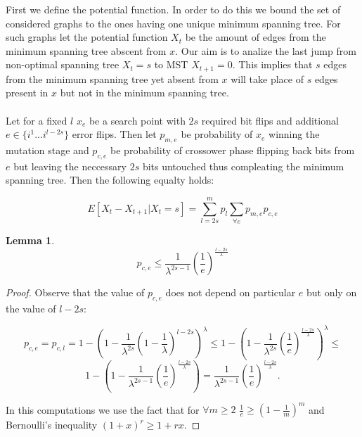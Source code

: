 \documentclass{article}
\newtheorem{lemma}[theorem]{Lemma}
\begin{document}
First we define the potential function. In order to do this we bound the set of considered graphs to the ones having one unique minimum spanning tree. For such graphs let the potential function $X_t$ be the amount of edges from the minimum spanning tree abscent from $x$. Our aim is to analize the last jump from non-optimal spanning tree $X_t = s$ to MST $X_{t + 1} = 0$. This implies that $s$ edges from the minimum spanning tree yet absent from $x$ will take place of $s$ edges present in $x$ but not in the minimum spanning tree.
\\
\\
Let for a fixed $l$ $x_e$ be a search point with $2s$ required bit flips and additional $e \in \{i^1...i^{l-2s}\}$ error flips. Then let $p_{m,e}$ be probability of $x_e$ winning the mutation stage and $p_{c,e}$ be probability of crossower phase flipping back bits from $e$ but leaving the neccessary $2s$ bits untouched thus compleating the minimum spanning tree. Then the following equalty holds:

$$
E[X_t - X_{t+1} | X_t = s] = \sum_{l=2s}^{m} p_l \sum_{\forall e} p_{m,e} p_{c,e}
$$


\begin{lemma}
$$ p_{c, e} \leq \frac{1}{\lambda^{2s - 1}}(\frac{1}{e})^\frac{l - 2s}{\lambda} $$
\end{lemma}
\begin{proof}
Observe that the value of $p_{c, e}$ does not depend on particular $e$ but only on the value of $l - 2s$:

$$
p_{c, e} = p_{c, l} = 
1 - (1 - \frac{1}{\lambda^{2s}}(1 - \frac{1}{\lambda})^{l - 2s})^\lambda \leq
1 - (1 - \frac{1}{\lambda^{2s}}(\frac{1}{e})^\frac{l - 2s}{\lambda})^\lambda \leq
$$
$$
1 - (1 - \frac{1}{\lambda^{2s - 1}}(\frac{1}{e})^\frac{l - 2s}{\lambda}) =
 \frac{1}{\lambda^{2s - 1}}(\frac{1}{e})^\frac{l - 2s}{\lambda}.
$$

In this computations we use the fact that for  $\forall m \geq 2$  $\frac{1}{e} \geq (1 - \frac{1}{m})^m$ and Bernoulli's inequality  ${(1+x)^r \geq 1 + rx}$.
\end{proof}
\end{document}
